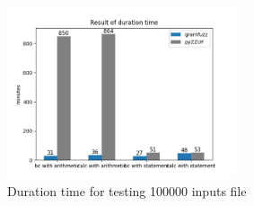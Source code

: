 \documentclass[11pt,a4paper]{article}
\begin{document}
\begin{figure}[H]
    \centering
    \label{duration}
    
    \includegraphics[width=0.6\textwidth]{duration.png}
    \caption{Duration time for testing 100000 inputs file}
\end{figure}
\end{document}
